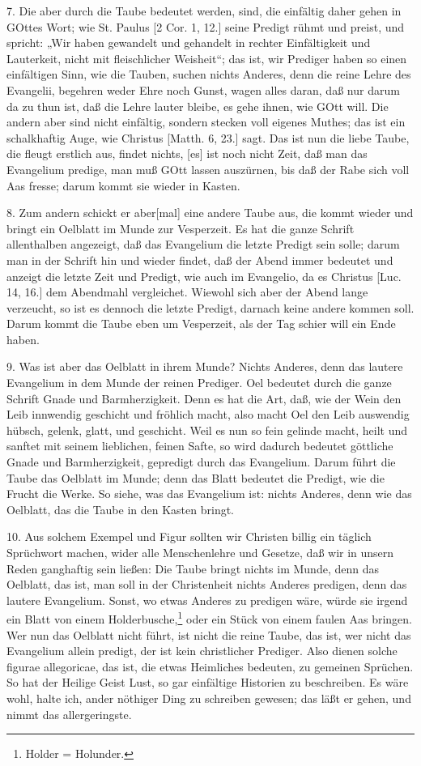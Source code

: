 7. Die aber durch die Taube bedeutet werden, sind, die einfältig daher gehen in GOttes Wort; wie St. Paulus [2 Cor. 1, 12.] seine Predigt rühmt und preist, und spricht: „Wir haben gewandelt und gehandelt in rechter Einfältigkeit und Lauterkeit, nicht mit fleischlicher Weisheit“; das ist, wir Prediger haben so einen einfältigen Sinn, wie die Tauben, suchen nichts Anderes, denn die reine Lehre des Evangelii, begehren weder Ehre noch Gunst, wagen alles daran, daß nur darum da zu thun ist, daß die Lehre lauter bleibe, es gehe ihnen, wie GOtt
will. Die andern aber sind nicht einfältig, sondern stecken voll eigenes Muthes; das ist ein schalkhaftig Auge, wie Christus [Matth. 6, 23.] sagt. Das ist nun die liebe Taube, die fleugt erstlich aus, findet nichts, [es] ist noch nicht Zeit, daß man das Evangelium predige, man muß GOtt lassen auszürnen, bis daß der Rabe sich voll Aas fresse; darum kommt sie wieder in Kasten.

8. Zum andern schickt er aber[mal] eine andere Taube aus, die kommt wieder und bringt ein Oelblatt im Munde zur Vesperzeit. Es hat die ganze Schrift allenthalben angezeigt, daß das Evangelium die letzte Predigt sein solle; darum man in der Schrift hin und wieder findet, daß der Abend immer bedeutet und anzeigt die letzte Zeit und Predigt, wie auch im Evangelio, da es Christus [Luc. 14, 16.] dem Abendmahl vergleichet. Wiewohl sich aber der Abend lange verzeucht, so ist es dennoch die letzte Predigt, darnach keine andere kommen soll. Darum kommt die Taube eben um Vesperzeit, als der Tag schier will ein Ende haben.

9. Was ist aber das Oelblatt in ihrem Munde? Nichts Anderes, denn das lautere Evangelium in dem Munde der reinen Prediger. Oel bedeutet durch die ganze Schrift Gnade und Barmherzigkeit. Denn es hat die Art, daß, wie der Wein den Leib innwendig geschicht und fröhlich macht, also macht Oel den Leib auswendig hübsch, gelenk, glatt, und geschicht. Weil es nun so fein gelinde macht, heilt und sanftet mit seinem lieblichen, feinen Safte, so wird dadurch bedeutet göttliche Gnade und Barmherzigkeit, gepredigt durch das Evangelium. Darum führt die Taube das Oelblatt im Munde; denn das Blatt bedeutet die Predigt, wie die Frucht die Werke. So siehe, was das Evangelium ist: nichts Anderes, denn wie das Oelblatt, das die Taube in den Kasten bringt.

10. Aus solchem Exempel und Figur sollten wir Christen billig ein täglich Sprüchwort machen, wider alle Menschenlehre und Gesetze, daß wir in unsern Reden ganghaftig sein ließen: Die Taube bringt nichts im Munde, denn das Oelblatt, das ist, man soll in der Christenheit nichts Anderes predigen, denn das lautere Evangelium. Sonst, wo etwas Anderes zu predigen wäre, würde sie irgend ein Blatt von einem Holderbusche,\footnote{Holder = Holunder.} oder ein Stück von einem faulen Aas bringen. Wer nun das Oelblatt nicht führt, ist nicht die reine Taube, das ist, wer nicht das Evangelium allein predigt, der ist kein christlicher Prediger. Also dienen solche figurae allegoricae, das ist, die etwas Heimliches bedeuten, zu gemeinen Sprüchen. So hat der Heilige Geist Lust, so gar einfältige Historien zu beschreiben. Es wäre wohl, halte ich, ander nöthiger Ding zu schreiben gewesen; das läßt er gehen, und nimmt das allergeringste.

